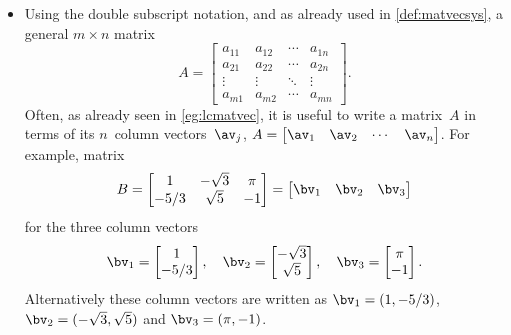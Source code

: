 \begin{itemize}
\item Using the double subscript notation, and as already used in \autoref{def:matvecsys}, a general \(m\times n\) matrix
\begin{equation*}
A=\begin{bmatrix}  a_{11}&a_{12}&\cdots&a_{1n}
\\a_{21}&a_{22}&\cdots&a_{2n}
\\\vdots&\vdots&\ddots&\vdots
\\a_{m1}&a_{m2}&\cdots&a_{mn} \end{bmatrix}.
\end{equation*}
Often, as already seen in \autoref{eg:lcmatvec}, it is useful to write a matrix~\(A\) in terms of its \(n\)~column vectors~\(\av_j\), \(A=\begin{bmatrix} \av_1&\av_2&\cdots&\av_n \end{bmatrix}\).
For example, matrix
\begin{equation*}
B=\begin{bmatrix}   1 & -\sqrt3 & \pi
\\ -5/3 & \sqrt5 & -1 \end{bmatrix}
=\begin{bmatrix} \bv_1&\bv_2&\bv_3 \end{bmatrix}
\end{equation*}
for the three column vectors
\begin{equation*}
\bv_1=\begin{bmatrix}   1 \\ -5/3 \end{bmatrix},\quad
\bv_2=\begin{bmatrix} -\sqrt3 \\ \sqrt5 \end{bmatrix},\quad
\bv_3=\begin{bmatrix} \pi \\ -1 \end{bmatrix}.
\end{equation*}
Alternatively these column vectors are written as 
\(\bv_1=(  1,-5/3)\),
\(\bv_2=(-\sqrt3,\sqrt5)\) and
\(\bv_3=(\pi,-1)\).




\end{itemize}
